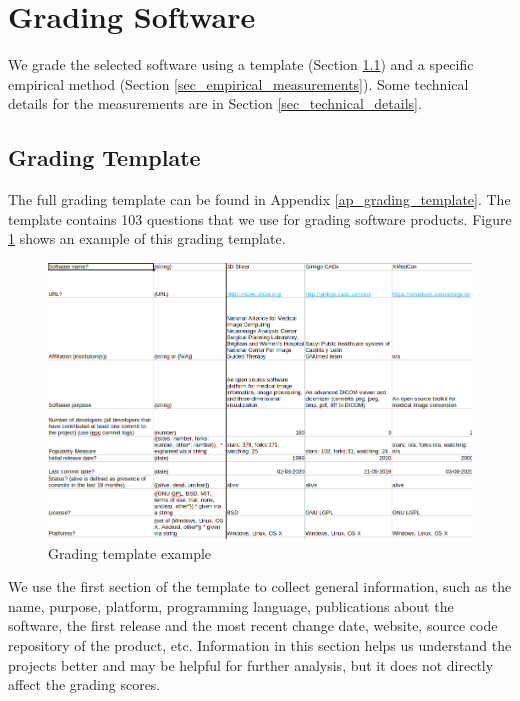 \section{Grading Software}
\label{sec_grading_software}

We grade the selected software using a template (Section \ref{sec_grading_template}) and a specific empirical method (Section \ref{sec_empirical_measurements}). Some technical details for the measurements are in Section \ref{sec_technical_details}.

\subsection{Grading Template}
\label{sec_grading_template}
The full grading template can be found in Appendix \ref{ap_grading_template}. The template contains 103 questions that we use for grading software products. Figure \ref{fg_grading_template_example} shows an example of this grading template.

\begin{figure}[h]
\includegraphics[scale=0.42]{figures/template.png}
\caption{Grading template example}
\label{fg_grading_template_example}
\end{figure}

We use the first section of the template to collect general information, such as the name, purpose, platform, programming language, publications about the software, the first release and the most recent change date, website, source code repository of the product, etc. Information in this section helps us understand the projects better and may be helpful for further analysis, but it does not directly affect the grading scores.


